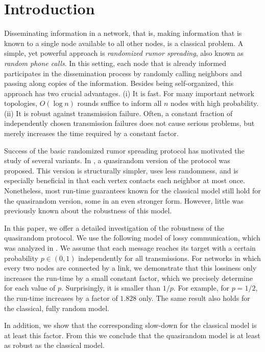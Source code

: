 \documentclass[12pt]{article}
\begin{document}
{\sloppy
\section{Introduction}
  Disseminating information in a network, that is, making information that is known to a single node available to all other nodes, is a classical problem. A simple, yet powerful approach is \emph{randomized rumor spreading}, also known as \emph{random phone calls}. In this setting, each node that is already informed participates in the dissemination process by  randomly calling neighbors and passing along copies of the information. Besides being self-organized, this approach has two crucial advantages. (i) It is fast. For many important network topologies, $O(\log n)$ rounds suffice to inform all $n$ nodes with high probability. (ii) It is robust against transmission failure. Often, a constant fraction of independently chosen transmission failures does not cause serious problems, but merely increases the time required by a constant factor. 
  
  Success of the basic randomized rumor spreading protocol has motivated the study of several variants. In \cite{DFS08}, a quasirandom version of the protocol was proposed. This version is structurally simpler, uses less randomness, and is especially beneficial in that each vertex contacts each neighbor at most once. Nonetheless, most run-time guarantees known for the classical model still hold for the quasirandom version, some in an even stronger form. However, little was previously known about the robustness of this model. 
  
  In this paper, we offer a detailed investigation of the robustness of the quasirandom protocol. We use the following model of lossy communication, which was analyzed in \cite{MR2239598}. We assume that each message reaches its target with a certain probability $p \in (0,1)$ independently for all transmissions. For networks in which every two nodes are connected by a link, we demonstrate that this lossiness only increases the run-time by a small constant factor, which we precisely determine for each value of $p$. Surprisingly, it is smaller than $1/p$. For example, for $p = 1/2$, the run-time increases by a factor of $1.828$ only. The same result also holds for the classical, fully random model.
  
  In addition, we show that the corresponding slow-down for the classical model is at least this factor. From this we conclude that the quasirandom model is at least as robust as the classical model. 
  
}
\end{document}
